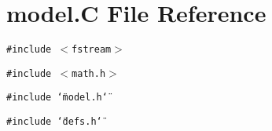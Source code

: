 \section{model.C File Reference}
\label{model_C}
{\tt \#include $<$fstream$>$}\par
{\tt \#include $<$math.h$>$}\par
{\tt \#include \char`\"{}model.h\char`\"{}}\par
{\tt \#include \char`\"{}defs.h\char`\"{}}\par
